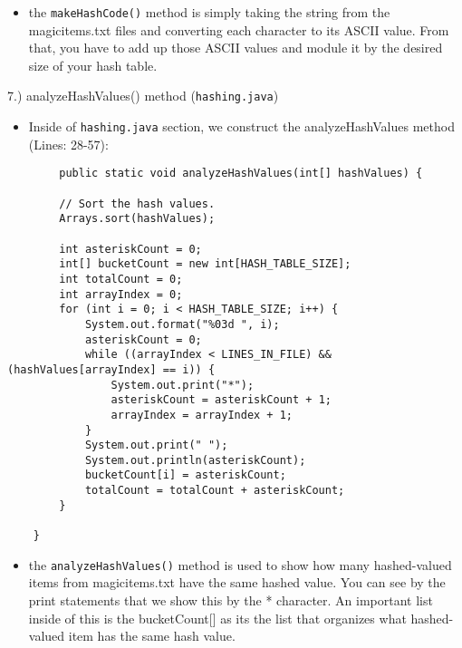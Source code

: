 \documentclass{article}
\begin{document}
\begin{itemize}

\item the \verb|makeHashCode()| method is simply taking the string from the magicitems.txt files and converting each character to its ASCII value. From that, you have to add up those ASCII values and module it by the desired size of your hash table.\\

\end{itemize}

\pagebreak
\begin{large}
    7.) analyzeHashValues() method (\verb|hashing.java|)
\end{large}

\begin{itemize}
\item Inside of \verb|hashing.java| section, we construct the analyzeHashValues method (Lines: 28-57):
\end{itemize}

\begin{verbatim}
        public static void analyzeHashValues(int[] hashValues) {
    
        // Sort the hash values.
        Arrays.sort(hashValues);
    
        int asteriskCount = 0;
        int[] bucketCount = new int[HASH_TABLE_SIZE];
        int totalCount = 0;
        int arrayIndex = 0;
        for (int i = 0; i < HASH_TABLE_SIZE; i++) {
            System.out.format("%03d ", i);
            asteriskCount = 0;
            while ((arrayIndex < LINES_IN_FILE) && (hashValues[arrayIndex] == i)) {
                System.out.print("*");
                asteriskCount = asteriskCount + 1;
                arrayIndex = arrayIndex + 1;
            }
            System.out.print(" ");
            System.out.println(asteriskCount);
            bucketCount[i] = asteriskCount;
            totalCount = totalCount + asteriskCount;
        }
    
    }
\end{verbatim}

\begin{itemize}

\item the \verb|analyzeHashValues()| method is used to show how many hashed-valued items from magicitems.txt have the same hashed value. You can see by the print statements that we show this by the * character. An important list inside of this is the bucketCount[] as its the list that organizes what hashed-valued item has the same hash value.\\

\end{itemize}
\end{document}
